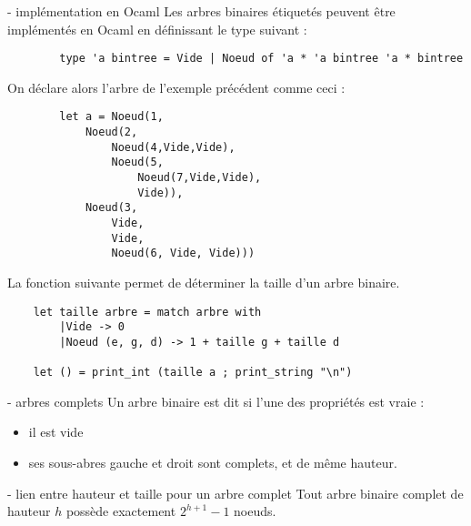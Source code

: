 \begin{exemple}{7.8}{ - implémentation en Ocaml}
    Les arbres binaires étiquetés peuvent être implémentés en Ocaml en définissant le type suivant :
    \begin{verbatim}
        type 'a bintree = Vide | Noeud of 'a * 'a bintree 'a * bintree
    \end{verbatim}
    On déclare alors l'arbre de l'exemple précédent comme ceci : 
    \begin{verbatim}
        let a = Noeud(1,
            Noeud(2,
                Noeud(4,Vide,Vide),
                Noeud(5,
                    Noeud(7,Vide,Vide),
                    Vide)),
            Noeud(3,
                Vide,
                Vide, 
                Noeud(6, Vide, Vide)))
    \end{verbatim}
    La fonction suivante permet de déterminer la taille d'un arbre binaire.
    \begin{verbatim}
    let taille arbre = match arbre with
        |Vide -> 0
        |Noeud (e, g, d) -> 1 + taille g + taille d

    let () = print_int (taille a ; print_string "\n")
    \end{verbatim}
\end{exemple}

\begin{definition}{7.9}{ - arbres complets}
    Un arbre binaire est dit  si l'une des propriétés est vraie : \begin{itemize}
        \item il est vide
        \item ses sous-abres gauche et droit sont complets, et de même hauteur.
    \end{itemize}
    
\end{definition}

\begin{proposition}{7.10}{ - lien entre hauteur et taille pour un arbre complet}
    Tout arbre binaire complet de hauteur $h$ possède exactement $2^{h+1} - 1$ noeuds.
\end{proposition}

